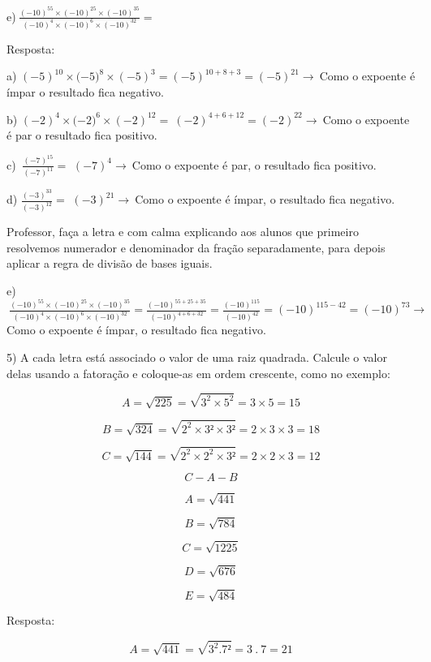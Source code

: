 e)\(\ \frac{{( - 10)}^{55} \times {( - 10)}^{25} \times {( - 10)}^{35}}{{( - 10)}^{4} \times {( - 10)}^{6} \times {( - 10)}^{32}} =\)

Resposta:

a)
\({( - 5)}^{10} \times ( - {5)}^{8} \times \left( - 5 \right)^{3} = \left( - 5 \right)^{10 + 8 + 3} = \left( - 5 \right)^{21} \rightarrow \ \)Como
o expoente é ímpar o resultado fica negativo.

b)
\({( - 2)}^{4} \times ( - {2)}^{6} \times \left( - 2 \right)^{12} = \ \left( - 2 \right)^{4 + 6 + 12} = \left( - 2 \right)^{22} \rightarrow \ \)Como
o expoente é par o resultado fica positivo.

c) \(\ \frac{{( - 7)}^{15}}{{( - 7)}^{11}} =\)
\({( - 7)}^{4} \rightarrow \ \)Como o expoente é par, o resultado fica
positivo.

d) \(\frac{{( - 3)}^{33}}{{( - 3)}^{12}} =\)
\({( - 3)}^{21} \rightarrow \ \)Como o expoente é ímpar, o resultado
fica negativo.

Professor, faça a letra e com calma explicando aos alunos que primeiro
resolvemos numerador e denominador da fração separadamente, para depois
aplicar a regra de divisão de bases iguais.

e)\(\ \frac{{( - 10)}^{55} \times {( - 10)}^{25} \times {( - 10)}^{35}}{{( - 10)}^{4} \times {( - 10)}^{6} \times {( - 10)}^{32}} = \frac{{( - 10)}^{55 + 25 + 35}}{{( - 10)}^{4 + 6 + 32}} = \frac{{( - 10)}^{115}}{{( - 10)}^{42}} = {( - 10)}^{115 - 42} = {( - 10)}^{73} \rightarrow \ \)Como
o expoente é ímpar, o resultado fica negativo.

5) A cada letra está associado o valor de uma raiz quadrada. Calcule o
valor delas usando a fatoração e coloque-as em ordem crescente, como no
exemplo:

\[A = \sqrt{225} = \sqrt{3^{2} \times 5^{2}} = 3 \times 5 = 15\]

\[B = \sqrt{324} = \sqrt{2^2 \times 3² \times 3²} = 2 \times 3 \times 3 = 18\]

\[C = \sqrt{144} = \sqrt{2^2 \times 2^2 \times 3²} = 2 \times 2 \times 3 = 12\]

\[C - A - B\]

\[A = \sqrt{441}\]

\[B = \sqrt{784}\]

\[C = \sqrt{1225}\]

\[D = \sqrt{676}\]

\[E = \sqrt{484}\]

Resposta:

\[A = \sqrt{441} = \sqrt{3^{2}.7²} = 3\ .\ 7 = 21\]

